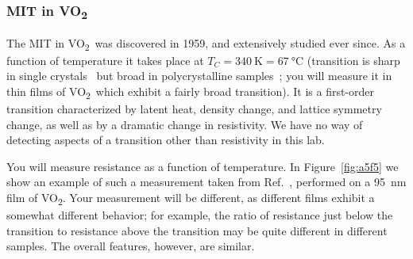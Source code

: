 \documentclass[11pt,a4paper]{article}
\newcommand{\VOtwo}{VO\textsubscript{2}}
\begin{document}
\subsubsection{MIT in \VOtwo}

The MIT in \VOtwo\ was discovered in 1959, and extensively studied ever since. As
a function of temperature it takes place at
$T_C = \SI{340}{\kelvin} = \SI{67}{\degreeCelsius}$ (transition is sharp in single
crystals~\cite{ref:bergland} but broad in polycrystalline
samples~\cite{ref:gurvitch}; you will measure it in thin films of \VOtwo\ which
exhibit a fairly broad transition). It is a first-order transition characterized
by latent heat, density change, and lattice symmetry change, as well as by a
dramatic change in resistivity. We have no way of detecting aspects of a
transition other than resistivity in this lab.

You will measure resistance as a function of temperature. In
Figure~\ref{fig:a5f5} we show an example of such a measurement taken from
Ref.~\cite{ref:gurvitch}, performed on a \SI{95}{\nano\metre} film of \VOtwo. Your
measurement will be different, as different films exhibit a somewhat different
behavior; for example, the ratio of resistance just below the transition to
resistance above the transition may be quite different in different samples. The
overall features, however, are similar.
\end{document}
